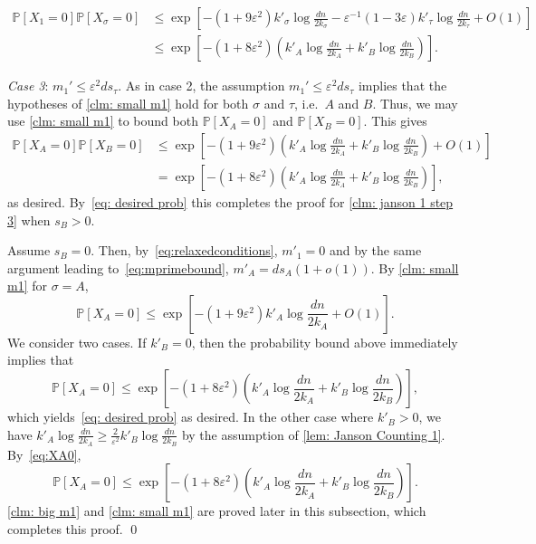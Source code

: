 \documentclass[11pt]{article}
\newcommand{\eps}{\varepsilon}
\def\P{\mathbb P}
\theoremstyle{plain}
\begin{document}
\begin{align*}
    \P[X_1 = 0]\P[X_\sigma = 0] &\leq \exp\left[-(1 + 9\eps^2)k'_\sigma\log\frac{dn}{2k_\sigma} - \eps^{-1}(1 - 3\eps)k'_\tau\log\frac{dn}{2k_\tau}+ O(1)\right]\\
    &\leq \exp\left[-(1 + 8\eps^2)\left(k'_A\log\frac{dn}{2k_A} + k'_B\log\frac{dn}{2k_B}\right)\right].
\end{align*}



{\em Case 3}: $m_1'\le \eps^2 ds_{\tau}$. As in case 2, the assumption $m_1'\le \eps^2 ds_{\tau}$ implies that the hypotheses of \cref{clm: small m1} hold for both $\sigma$ and $\tau$, i.e.\ $A$ and $B$. Thus, we may use \cref{clm: small m1} to bound both $\P[X_A = 0]$ and $\P[X_B = 0]$. This gives 
\begin{align*}
    \P[X_A= 0]\P[X_B = 0] &\leq  \exp\left[-(1 + 9\eps^2)\left(k'_A\log\frac{dn}{2k_A} + k'_B\log\frac{dn}{2k_B}\right)+ O(1)\right]\\
    &= \exp\left[-(1 + 8\eps^2)\left(k'_A\log\frac{dn}{2k_A} + k'_B\log\frac{dn}{2k_B}\right)\right],
\end{align*}
as desired. By~\eqref{eq: desired prob} this completes the proof for \cref{clm: janson 1 step 3} when $s_B>0$.


 Assume $s_B = 0$. Then, by~\eqref{eq:relaxedconditions}, $m'_1=0$ and by the same argument leading to~\eqref{eq:mprimebound}, $m'_A = ds_A(1 +o(1))$. By \cref{clm: small m1} for $\sigma=A$,  
\begin{equation}
\P[X_A = 0] \leq \exp\left[-(1 + 9\eps^2)k'_A\log\frac{dn}{2k_A} + O(1)\right].\label{eq:XA0}
\end{equation}
We consider two cases. 
If $ k'_B = 0$, then the probability bound above immediately implies that
\[
\P[X_A = 0] \leq \exp\left[-(1 + 8\eps^2)\left(k'_A\log\frac{dn}{2k_A} + k'_B\log\frac{dn}{2k_B}\right)\right],
\]
which yields~\eqref{eq: desired prob} as desired. In the other case where $ k'_B>0$, we have $k'_A\log\frac{dn}{2k_A} \geq \frac{2}{\eps^2}k'_B\log\frac{dn}{2k_B}$ by the assumption of \cref{lem: Janson Counting 1}. By~\eqref{eq:XA0}, 
\[
\P[X_A = 0]\leq \exp\left[-(1 + 8\eps^2)\left(k'_A\log\frac{dn}{2k_A} + k'_B\log\frac{dn}{2k_B}\right)\right].
\]
\cref{clm: big m1} and \cref{clm: small m1} are proved later in this subsection, which completes this proof.
\qed
\end{document}

